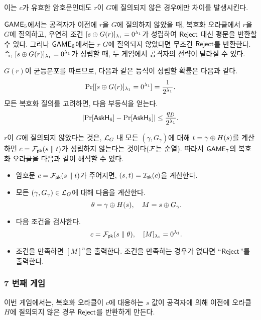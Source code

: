 이는 $c$가 유효한 암호문인데도 $r$이 $G$에 질의되지 않은 경우에만 차이를
발생시킨다. 

\begin{memo}
	$\textsf{GAME}_5$에서는 공격자가 이전에 $r$을 $G$에 질의하지 않았을 때, 복호화
	오라클에서 $r$을 $G$에 질의하고, 우연히 조건 $[s \oplus G(r)]_{\lambda_1} =
	0^{\lambda_1}$가 성립하여 $\textsf{Reject}$ 대신 평문을 반환할 수 있다. 그러나
	$\textsf{GAME}_6$에서는 $r$ $G$에 질의되지 않았다면 무조건 $\textsf{Reject}$를 반환한다. 즉,
	$[s \oplus G(r)]_{\lambda_1} = 0^{\lambda_1}$가 성립할 때, 두 게임에서 공격자의
	전략이 달라질 수 있다.
\end{memo}

$G(r)$이 균등분포를 따르므로, 다음과 같은 등식이 성립할 확률은 다음과 같다.
$$
	\Pr[[s \oplus G(r)]_{\lambda_1} = 0^{\lambda_1}] = \frac{1}{2^{\lambda_1}}.
$$
모든 복호화 질의를 고려하면, 다음 부등식을 얻는다.
$$	
	\left| \Pr[\textsf{AskH}_6] - \Pr[\textsf{AskH}_5] \right| \leq \frac{q_D}{2^{\lambda_1}}.
$$

\begin{memo}
	$r$이 $G$에 질의되지 않았다는 것은, $\mathcal{L}_G$ 내 모든 $(\gamma,
	G_{\gamma})$에 대해 $t = \gamma \oplus H(s)$를 계산하면 $c = \mathcal{F}_{\textsf{pk}}(s
	\parallel t)$가 성립하지 않는다는 것이다($\mathcal{F}$는 순열).
	따라서 $\textsf{GAME}_7$의 복호화 오라클을 다음과 같이 해석할 수 있다.
	\begin{tcolorbox}
		\begin{itemize}
			\item 암호문 $c = \mathcal{F}_{\textsf{pk}}(s \parallel t)$가 주어지면, $(s,t) =
			\mathcal{I}_{\textsf{sk}}(c)$을 계산한다.
			\item 모든 $(\gamma, G_\gamma) \in \mathcal{L}_G$에 대해 다음을 계산한다.
			$$
				\theta = \gamma \oplus H(s), \quad M = s \oplus G_{\gamma}.
			$$
			\item 다음 조건을 검사한다.
			$$
				c = \mathcal{F}_{\textsf{pk}}(s \parallel \theta), \quad [M]_{\lambda_1} = 0^{\lambda_1}.
			$$
			\item 조건을 만족하면 $[M]^{n}$을 출력한다. 조건을 만족하는
			경우가 없다면 “$\textsf{Reject}$”를 출력한다.
		\end{itemize}
	\end{tcolorbox}
\end{memo}

\newpage
\subsubsection{7 번째 게임}

이번 게임에서는, 복호화 오라클이 $c$에 대응하는 $s$ 값이 공격자에 의해 이전에
오라클 $H$에 질의되지 않은 경우 $\textsf{Reject}$를 반환하게 만든다. 

